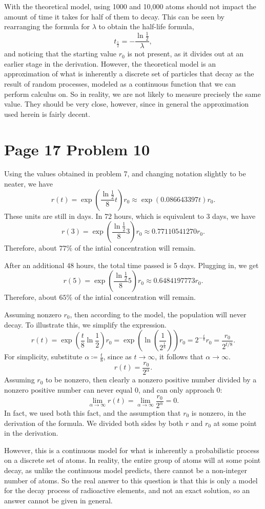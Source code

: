 \documentclass[11pt, letterpaper]{report}
\begin{document}
\begin{solution}
With the theoretical model, using 1000 and 10,000 atoms should not impact the amount of time it takes for half of them to decay. This can be seen by rearranging the formula for $\lambda $ to obtain the half-life formula,
\[
	t_{\frac{1}{2}}=-\frac{\ln \frac{1}{2}}{\lambda }
,\]
and noticing that the starting value $r_0$ is not present, as it divides out at an earlier stage in the derivation. However, the theoretical model is an approximation of what is inherently a discrete set of particles that decay as the result of random processes, modeled as a continuous function that we can perform calculus on. So in reality, we are not likely to measure precisely the same value. They should be very close, however, since in general the approximation used herein is fairly decent.
\end{solution}
\section*{Page 17 Problem 10}
\begin{solution}
	Using the values obtained in problem 7, and changing notation slightly to be neater, we have
	\[
		r(t)=\exp\left(\frac{\ln \frac{1}{2}}{8}t\right)r_0\approx \exp\left(0.086643397t\right)r_0
	.\]
	These units are still in days. In 72 hours, which is equivalent to 3 days, we have
	\[
		r(3)=\exp \left( \frac{\ln \frac{1}{2}}{8}3 \right) r_0\approx 0.77110541270r_0
	.\]
	Therefore, about $77\%$ of the intial concentration will remain.
	
	After an additional 48 hours, the total time passed is 5 days. Plugging in, we get
	\[
		r(5)=\exp \left( \frac{\ln \frac{1}{2}}{8}5 \right) r_0\approx 0.6484197773r_0
	.\]
	Therefore, about $65\%$ of the intial concentration will remain.

	Assuming nonzero $r_0$, then according to the model, the population will never decay. To illustrate this, we simplify the expression.
	\[
		r(t)=\exp \left( \frac{t}{8}\ln \frac{1}{2} \right) r_0=\exp \left( \ln \left( \frac{1}{2 ^{\frac{t}{8}}} \right) \right) r_0=2^{-\frac{t}{8}}r_0=\frac{r_0}{2^{t/8}}
	.\]
	For simplicity, substitute $\alpha \coloneqq \frac{t}{8}$, since as $t\to \infty$, it follows that $\alpha \to \infty$.
\[
	r(t)=\frac{r_0}{2^\alpha }
.\]
Assuming $r_0$ to be nonzero, then clearly a nonzero positive number divided by a nonzero positive number can never equal 0, and can only approach 0:
\[
	\lim_{\alpha  \to \infty} r(t)=\lim_{\alpha  \to \infty} \frac{r_0}{2^\alpha }=0
.\]
In fact, we used both this fact, and the assumption that $r_0$ is nonzero, in the derivation of the formula. We divided both sides by both $r$ and $r_0$ at some point in the derivation.

However, this is a continuous model for what is inherently a probabilistic process on a discrete set of atoms. In reality, the entire group of atoms will at some point decay, as unlike the continuous model predicts, there cannot be a non-integer number of atoms. So the real answer to this question is that this is only a model for the decay process of radioactive elements, and not an exact solution, so an answer cannot be given in general.
\end{solution}
\end{document}

